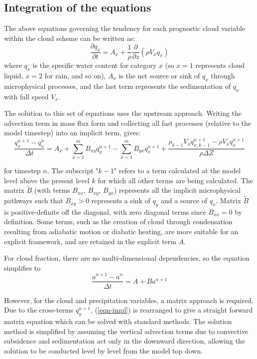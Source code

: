 \documentclass[
a4paper,     %
12pt,        %
article,
onecolumn,   %
openany,     %
]{memoir}
\begin{document}
\subsection{Integration of the equations}
  
The above equations governing the tendency for each prognostic cloud
variable within the cloud scheme can be written as:
\begin{equation}
\frac{\partial {q}_x}{\partial t} = A_x +
\frac{1}{\rho}\frac{\partial}{\partial z} \left( \rho V_x {q}_x \right)
\end{equation}
where $q_x$ is the specific water content for category $x$ (so $x=1$
represents cloud liquid, $x=2$ for rain, and so on), $A_x$ is the net source
or sink of $q_x$ through microphysical processes, and the last term
represents the sedimentation of $q_x$ with fall speed $V_x$.

The solution to this set of equations uses the upstream approach. Writing the
advection term in mass flux form and collecting all fast processes (relative 
to the model timestep) into an implicit term, gives:
\begin{equation}
\frac{q_x^{n+1}-q_x^{n}}{\Delta t} = A_x 
+\sum_{x=1}^{m}B_{xy}q_y^{n+1}
-\sum_{x=1}^{m}B_{yx}q_x^{n+1}
+\frac{ 
\rho_{k-1} V_{x} q_{x,k-1}^{n+1} - \rho V_{x} q_{x}^{n+1} }{ \rho \Delta
Z}
\label{eqn-impl}
\end{equation}

for timestep $n$. The subscript "$k-1$" refers to a term calculated at the model
level above the present level $k$ for which all other terms are being
calculated. The matrix $\widetilde{B}$ (with terms $B_{xx}$, $B_{xy}$, $B_{yx}$)
represents all the implicit microphysical pathways such that $B_{xy}>0$
represents a sink of $q_y$ and a source of $q_x$. Matrix $\widetilde{B}$ is
positive-definite off the diagonal, with zero diagonal terms since $B_{xx}=0$ by
definition.  Some terms, such as the creation of cloud through condensation
resulting from adiabatic motion or diabatic heating, are more suitable for an
explicit framework, and are retained in the explicit term $A$.

For cloud fraction, there are no multi-dimensional dependencies, so the equation
simplifies to
\begin{equation}
\frac{a^{n+1}-a^{n}}{\Delta t} = A + Ba^{n+1}
\end{equation}

However, for the cloud and precipitation variables,  a
matrix approach is required. Due to the cross-terms $q_y^{n+1}$, 
(\ref{eqn-impl}) is rearranged to give a straight forward matrix equation which
can be solved with standard methods. 
The solution method is simplified by assuming the vertical advection terms due
to convective subsidence and sedimentation act only in the downward direction,
allowing the solution to be conducted level by level from the model top down.
\end{document}
